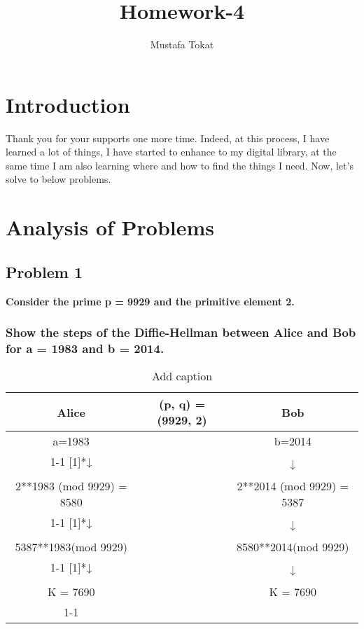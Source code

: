 \documentclass[11pt]{article}
\begin{document}
\title{Homework-4}
\author{Mustafa Tokat}
\maketitle
\section{Introduction}

Thank you for your supports one more time. Indeed, at this process, I have learned a lot of things,
I have started to enhance to my digital library, at the same time I am also learning where and how to find 
the things I need. Now, let's solve to below problems.
\section{Analysis of Problems}
\subsection{Problem 1} \textbf{Consider the prime p = 9929 and the primitive element 2.}
\subsubsection{\textbf{Show the steps of the Diffie-Hellman between Alice and Bob for a = 1983 and b = 2014.}}
\begin{table}[htbp]
    \centering
    \caption{Add caption}
      \begin{tabular}{ccc}
      \toprule
      Alice & (p, q) = (9929, 2) & Bob \\
      \midrule
      a=1983 &       & b=2014 \\
  \cmidrule{1-1}\cmidrule{3-3}    \multirow{2}[1]{*}{↓} &       & \multirow{2}[1]{*}{↓} \\
            &       &  \\
      \multicolumn{1}{c}{\multirow{2}[1]{*}{2**1983 (mod 9929)                                       = 8580}} &       & \multicolumn{1}{c}{\multirow{2}[1]{*}{2**2014 (mod 9929)              = 5387}} \\
            &       &  \\
  \cmidrule{1-1}\cmidrule{3-3}    \multirow{2}[1]{*}{↓} &       & \multirow{2}[1]{*}{↓} \\
            &       &  \\
      5387**1983(mod 9929) &       & 8580**2014(mod 9929) \\
  \cmidrule{1-1}\cmidrule{3-3}    \multirow{2}[1]{*}{↓} &       & \multirow{2}[1]{*}{↓} \\
            &       &  \\
      K = 7690 &       & K = 7690 \\
  \cmidrule{1-1}\cmidrule{3-3}    \end{tabular}%
    \label{tab:addlabel}%
  \end{table}%
  
\end{document}
